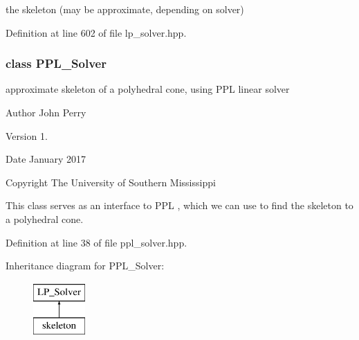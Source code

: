 the skeleton (may be approximate, depending on solver) 

Definition at line 602 of file lp\+\_\+solver.\+hpp.

\label{class_p_p_l___solver}
\subsubsection{class P\+P\+L\+\_\+\+Solver}
approximate skeleton of a polyhedral cone, using P\+PL linear solver 

\begin{DoxyAuthor}{Author}
John Perry 
\end{DoxyAuthor}
\begin{DoxyVersion}{Version}
1. 
\end{DoxyVersion}
\begin{DoxyDate}{Date}
January 2017 
\end{DoxyDate}
\begin{DoxyCopyright}{Copyright}
The University of Southern Mississippi
\end{DoxyCopyright}
This class serves as an interface to P\+PL \cite{BagnaraHZ08SCP}, which we can use to find the skeleton to a polyhedral cone. 

Definition at line 38 of file ppl\+\_\+solver.\+hpp.

Inheritance diagram for P\+P\+L\+\_\+\+Solver\+:\begin{figure}[H]
\begin{center}
\leavevmode
\includegraphics[height=2.000000cm]{group___c_l_s_solvers}
\end{center}
\end{figure}

